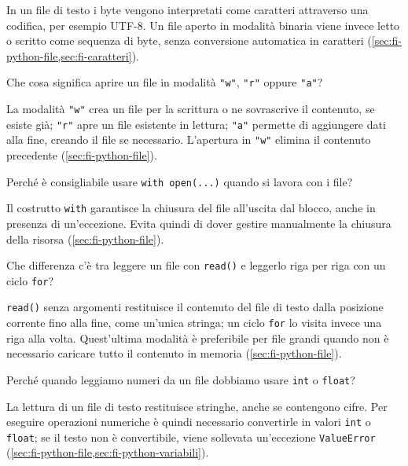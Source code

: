 In un file di testo i byte vengono interpretati come caratteri
attraverso una codifica, per esempio UTF-8. Un file aperto in
modalità binaria viene invece letto o scritto come sequenza di byte,
senza conversione automatica in caratteri
(\cref{sec:fi-python-file,sec:fi-caratteri}).

\begin{exercise}
\label{ex:fi-python-modalita-file}
Che cosa significa aprire un file in modalità \lstinline|"w"|,
\lstinline|"r"| oppure \lstinline|"a"|?
\end{exercise}

La modalità \lstinline|"w"| crea un file per la scrittura o ne
sovrascrive il contenuto, se esiste già; \lstinline|"r"| apre
un file esistente in lettura; \lstinline|"a"| permette di
aggiungere dati alla fine, creando il file se necessario.
L'apertura in \lstinline|"w"| elimina il contenuto precedente
(\cref{sec:fi-python-file}).

\begin{exercise}
\label{ex:fi-python-with-open}
Perché è consigliabile usare \lstinline|with open(...)| quando
si lavora con i file?
\end{exercise}

Il costrutto \texttt{with} garantisce la chiusura del file
all'uscita dal blocco, anche in presenza di un'eccezione.
Evita quindi di dover gestire manualmente la chiusura della
risorsa (\cref{sec:fi-python-file}).

\begin{exercise}
\label{ex:fi-python-read-for}
Che differenza c'è tra leggere un file con \texttt{read()} e
leggerlo riga per riga con un ciclo \texttt{for}?
\end{exercise}

\texttt{read()} senza argomenti restituisce il contenuto del file di
testo dalla posizione corrente fino alla fine, come un'unica stringa;
un ciclo \texttt{for} lo visita invece una riga alla volta. Quest'ultima modalità è
preferibile per file grandi quando non è necessario caricare
tutto il contenuto in memoria (\cref{sec:fi-python-file}).

\begin{exercise}
\label{ex:fi-python-conversione-file}
Perché quando leggiamo numeri da un file dobbiamo usare
\texttt{int} o \texttt{float}?
\end{exercise}

La lettura di un file di testo restituisce stringhe, anche se
contengono cifre. Per eseguire operazioni numeriche è quindi
necessario convertirle in valori \texttt{int} o \texttt{float};
se il testo non è convertibile, viene sollevata un'eccezione
\texttt{ValueError} (\cref{sec:fi-python-file,sec:fi-python-variabili}).

